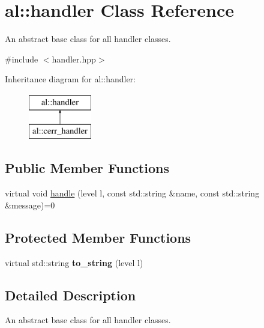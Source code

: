 \hypertarget{classal_1_1handler}{\section{al\-:\-:handler \-Class \-Reference}
\label{classal_1_1handler}
}


\-An abstract base class for all handler classes.  




{\ttfamily \#include $<$handler.\-hpp$>$}

\-Inheritance diagram for al\-:\-:handler\-:\begin{figure}[H]
\begin{center}
\leavevmode
\includegraphics[height=2.000000cm]{classal_1_1handler}
\end{center}
\end{figure}
\subsection*{\-Public \-Member \-Functions}
\begin{DoxyCompactItemize}
\item 
virtual void \hyperlink{classal_1_1handler_a29a3fb2757d02ed144cb71166aad1dfe}{handle} (level l, const std\-::string \&name, const std\-::string \&message)=0
\end{DoxyCompactItemize}
\subsection*{\-Protected \-Member \-Functions}
\begin{DoxyCompactItemize}
\item 
\hypertarget{classal_1_1handler_a46745146bc6348c43f6fd469df59ef2a}{virtual std\-::string {\bfseries to\-\_\-string} (level l)}\label{classal_1_1handler_a46745146bc6348c43f6fd469df59ef2a}

\end{DoxyCompactItemize}


\subsection{\-Detailed \-Description}
\-An abstract base class for all handler classes. 

